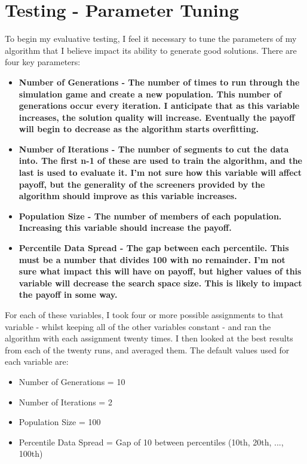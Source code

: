\section{Testing - Parameter Tuning} \label{actualTesting}
To begin my evaluative testing, I feel it necessary to tune the parameters of my algorithm that I believe impact its ability to generate good solutions. There are four key parameters:

\begin{itemize}
    \item \bf Number of Generations \rm - The number of times to run through the simulation game and create a new population. This number of generations occur every iteration. I anticipate that as this variable increases, the solution quality will increase. Eventually the payoff will begin to decrease as the algorithm starts overfitting.
    \item \bf Number of Iterations \rm - The number of segments to cut the data into. The first n-1 of these are used to train the algorithm, and the last is used to evaluate it. I'm not sure how this variable will affect payoff, but the generality of the screeners provided by the algorithm should improve as this variable increases.
    \item \bf Population Size \rm - The number of members of each population. Increasing this variable should increase the payoff.
    \item \bf Percentile Data Spread \rm - The gap between each percentile. This must be a number that divides 100 with no remainder. I'm not sure what impact this will have on payoff, but higher values of this variable will decrease the search space size. This is likely to impact the payoff in some way.
\end{itemize}

For each of these variables, I took four or more possible assignments to that variable - whilst keeping all of the other variables constant - and ran the algorithm with each assignment twenty times. I then looked at the best results from each of the twenty runs, and averaged them. The default values used for each variable are:
\begin{itemize}
    \item Number of Generations = 10
    \item Number of Iterations = 2
    \item Population Size = 100
    \item Percentile Data Spread = Gap of 10 between percentiles (10th, 20th, ..., 100th)
\end{itemize}

